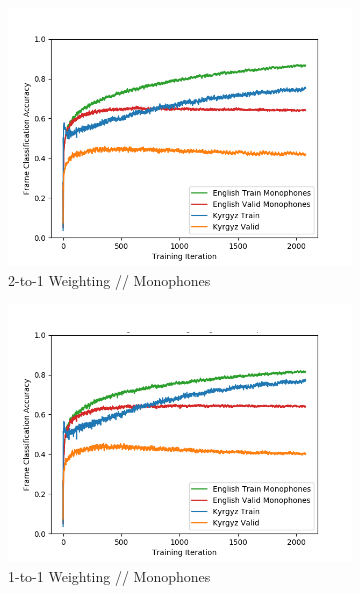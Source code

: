 \documentclass[a4paper]{article}
\begin{document}
\begin{figure}[!htbp]
\centering
\begin{subfigure}{.3\textwidth}
  \centering
  \includegraphics[width=1\textwidth,keepaspectratio]{figs-1/1-to-2-mono.png}
  \caption{2-to-1 Weighting // Monophones}
  \label{fig:sub1}
\end{subfigure}%
\begin{subfigure}{.3\textwidth}
  \centering
  \includegraphics[width=1\textwidth,keepaspectratio]{figs-1/1-to-1-mono.png}
  \caption{1-to-1 Weighting // Monophones}
  \label{fig:sub2}
\end{subfigure}%
\begin{subfigure}{.3\textwidth}
  \centering

\end{subfigure}
\end{figure}
\end{document}

